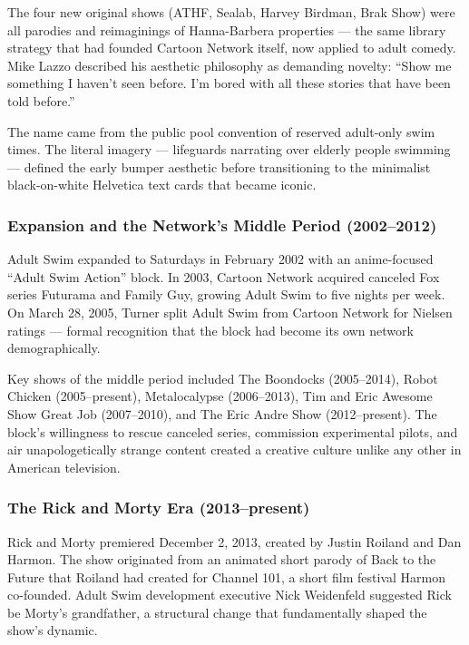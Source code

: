 \documentclass[11pt,letterpaper]{article}
\begin{document}
The four new original shows (ATHF, Sealab, Harvey Birdman, Brak Show) were all parodies and reimaginings of Hanna-Barbera properties --- the same library strategy that had founded Cartoon Network itself, now applied to adult comedy. Mike Lazzo described his aesthetic philosophy as demanding novelty: ``Show me something I haven't seen before. I'm bored with all these stories that have been told before.''

The name came from the public pool convention of reserved adult-only swim times. The literal imagery --- lifeguards narrating over elderly people swimming --- defined the early bumper aesthetic before transitioning to the minimalist black-on-white Helvetica text cards that became iconic.

\subsubsection{Expansion and the Network's Middle Period (2002--2012)}

Adult Swim expanded to Saturdays in February 2002 with an anime-focused ``Adult Swim Action'' block. In 2003, Cartoon Network acquired canceled Fox series Futurama and Family Guy, growing Adult Swim to five nights per week. On March 28, 2005, Turner split Adult Swim from Cartoon Network for Nielsen ratings --- formal recognition that the block had become its own network demographically.

Key shows of the middle period included The Boondocks (2005--2014), Robot Chicken (2005--present), Metalocalypse (2006--2013), Tim and Eric Awesome Show Great Job (2007--2010), and The Eric Andre Show (2012--present). The block's willingness to rescue canceled series, commission experimental pilots, and air unapologetically strange content created a creative culture unlike any other in American television.

\subsubsection{The Rick and Morty Era (2013--present)}

Rick and Morty premiered December 2, 2013, created by Justin Roiland and Dan Harmon. The show originated from an animated short parody of Back to the Future that Roiland had created for Channel 101, a short film festival Harmon co-founded. Adult Swim development executive Nick Weidenfeld suggested Rick be Morty's grandfather, a structural change that fundamentally shaped the show's dynamic.
\end{document}
